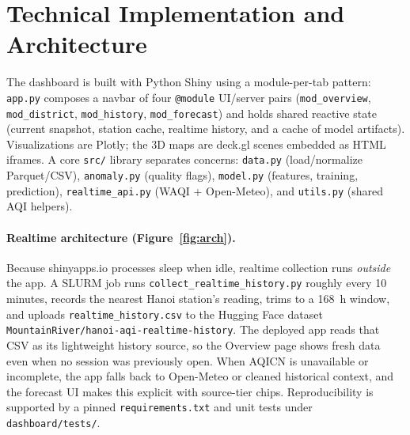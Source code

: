 \documentclass[a4paper]{article}
\begin{document}
\section{Technical Implementation and Architecture}
The dashboard is built with Python Shiny using a module-per-tab pattern: \texttt{app.py} composes a navbar
of four \texttt{@module} UI/server pairs (\texttt{mod\_overview}, \texttt{mod\_district},
\texttt{mod\_history}, \texttt{mod\_forecast}) and holds shared reactive state (current snapshot, station
cache, realtime history, and a cache of model artifacts). Visualizations are Plotly; the 3D maps are
deck.gl scenes embedded as HTML iframes. A core \texttt{src/} library separates concerns: \texttt{data.py}
(load/normalize Parquet/CSV), \texttt{anomaly.py} (quality flags), \texttt{model.py} (features, training,
prediction), \texttt{realtime\_api.py} (WAQI + Open-Meteo), and \texttt{utils.py} (shared AQI helpers).

\paragraph{Realtime architecture (Figure~\ref{fig:arch}).}
Because shinyapps.io processes sleep when idle, realtime collection runs \emph{outside} the app. A SLURM
job runs \texttt{collect\_realtime\_history.py} roughly every 10 minutes, records the nearest Hanoi
station's reading, trims to a 168~h window, and uploads \texttt{realtime\_history.csv} to the Hugging Face
dataset \texttt{MountainRiver/hanoi-aqi-realtime-history}. The deployed app reads that CSV as its
lightweight history source, so the Overview page shows fresh data even when no session was previously open.
When AQICN is unavailable or incomplete, the app falls back to Open-Meteo or cleaned historical context,
and the forecast UI makes this explicit with source-tier chips. Reproducibility is supported by a pinned
\texttt{requirements.txt} and unit tests under \texttt{dashboard/tests/}.
\end{document}
